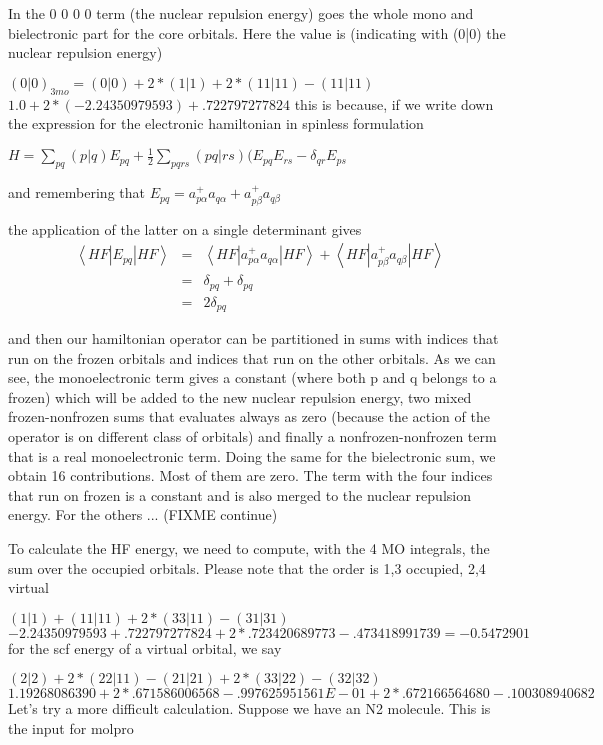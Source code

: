 \documentclass[a4paper,11pt]{report}
\begin{document}
In the 0 0 0 0 term (the nuclear repulsion energy) goes the whole mono and
bielectronic part for the core orbitals. Here the value is (indicating with
(0|0) the nuclear repulsion energy)

$
(0|0)_{3mo} = (0|0)+2*(1|1)+2*(11|11)-(11|11)
$
$
1.0 + 2*(-2.24350979593)+.722797277824
$
this is because, if we write down the expression for the electronic
hamiltonian in spinless formulation

$
H = \sum_{pq} (p|q) E_{pq} + \frac{1}{2} \sum_{pqrs} (pq|rs) (E_{pq}E_{rs} -
\delta_{qr} E_{ps}
$

and remembering that
$
E_{pq} = a^{+}_{p\alpha}a_{q\alpha} + a^{+}_{p\beta}a_{q\beta}
$

the application of the latter on a single determinant gives
\begin{eqnarray}
\left< HF \left| E_{pq} \right| HF \right> & = & \left< HF \left|
a^{+}_{p\alpha}a_{q\alpha} \right| HF \right> + \left< HF \left|
a^{+}_{p\beta}a_{q\beta} \right| HF \right> \\
& = & \delta_{pq} + \delta_{pq} \\
& = & 2 \delta_{pq} 
\end{eqnarray}

and then our hamiltonian operator can be partitioned in sums with indices
that run on the frozen orbitals and indices that run on the other orbitals.
As we can see, the monoelectronic term gives a constant (where both p and q
belongs to a frozen) which will be added to the new nuclear repulsion energy,
two mixed frozen-nonfrozen sums that evaluates always as zero
(because the action of the operator is on different class of orbitals) and
finally a nonfrozen-nonfrozen term that is a real monoelectronic term.
Doing the same for the bielectronic sum, we obtain 16 contributions. Most of
them are zero. The term with the four indices that run on frozen is a
constant and is also merged to the nuclear repulsion energy.
For the others ... (FIXME continue)

To calculate the HF energy, we need to compute, with the 4 MO integrals, the
sum over the occupied orbitals. Please note that the order is 1,3 occupied,
2,4 virtual

$
(1|1)+(11|11)+2*(33|11)-(31|31)
$
$
-2.24350979593+.722797277824+2*.723420689773-.473418991739 = -0.5472901
$
for the scf energy of a virtual orbital, we say

$
(2|2)+2*(22|11)-(21|21)+2*(33|22)-(32|32)
$
$
1.19268086390+2*.671586006568-.997625951561E-01+2*.672166564680-.100308940682
$
Let's try a more difficult calculation. Suppose we have an N2 molecule. This
is the input for molpro
\end{document}
